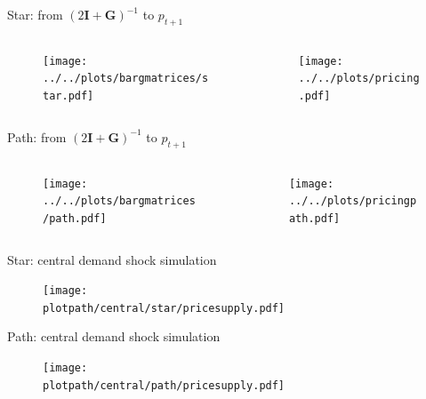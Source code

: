 \documentclass{beamer}
\newcommand{\matr}[1]{\bm{#1}}
\newcommand{\I}{\matr{I}}
\newcommand{\G}{\matr{G}}
\newcommand{\plotpath}{../../plots}
\begin{document}
\begin{frame} {Star: from $(2\I + \G)^{-1}$ to $p_{t+1}$ }

    \begin{columns}
        \begin{column}{.47\textwidth}
            \begin{figure}
                \texttt{[image: ../../plots/bargmatrices/star.pdf]}
            \end{figure}
        \end{column}
        \begin{column}{.47\textwidth}
            \begin{figure}
                \texttt{[image: ../../plots/pricing.pdf]}
            \end{figure}
        \end{column}
    \end{columns}

\end{frame}

\begin{frame} {Path: from $(2\I + \G)^{-1}$ to $p_{t+1}$ }
    \begin{columns}
        \begin{column}{.47\textwidth}
            \begin{figure}
                \texttt{[image: ../../plots/bargmatrices/path.pdf]}
            \end{figure}
        \end{column}
        \begin{column}{.47\textwidth}
            \begin{figure}
                \texttt{[image: ../../plots/pricingpath.pdf]}
            \end{figure}
        \end{column}
    \end{columns}
\end{frame}

\begin{frame}{Star: central demand shock simulation}
    \begin{figure}[H]
        \centering
        \texttt{[image: \\plotpath/central/star/pricesupply.pdf]}
    \end{figure}

\end{frame}

\begin{frame} {Path: central demand shock simulation}
    \begin{figure}[H]
        \centering
        \texttt{[image: \\plotpath/central/path/pricesupply.pdf]}
    \end{figure}
\end{frame}
\end{document}
